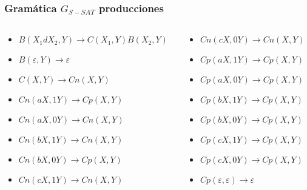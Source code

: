 \documentclass{beamer}
\begin{document}
\begin{frame}
    \frametitle{Gramática $G_{S-SAT}$ producciones}
    
    \begin{columns}
        \begin{column}{0.5\textwidth}
            \begin{itemize}
                \item $B(X_1dX_2,Y)\to C(X_1,Y) B(X_2,Y)$
                \item $B(\varepsilon,Y)\to\varepsilon$
                      
                \item $C(X,Y)\to Cn(X,Y)$
                      
                \item $Cn(aX,1Y) \to Cp(X,Y)$
                \item $Cn(aX,0Y) \to Cn(X,Y)$
                \item $Cn(bX,1Y) \to Cn(X,Y)$
                \item $Cn(bX,0Y) \to Cp(X,Y)$
                \item $Cn(cX,1Y) \to Cn(X,Y)$
                      
            \end{itemize}
        \end{column}
        \begin{column}{0.5\textwidth}
            \begin{itemize}
                \item $Cn(cX,0Y) \to Cn(X,Y)$
                \item $Cp(aX,1Y) \to Cp(X,Y)$
                \item $Cp(aX,0Y) \to Cp(X,Y)$
                \item $Cp(bX,1Y) \to Cp(X,Y)$
                \item $Cp(bX,0Y) \to Cp(X,Y)$
                \item $Cp(cX,1Y) \to Cp(X,Y)$
                \item $Cp(cX,0Y) \to Cp(X,Y)$
                \item $Cp(\varepsilon,\varepsilon)\to \varepsilon$
            \end{itemize}
        \end{column}
        
    \end{columns}
    
\end{frame}
\end{document}
